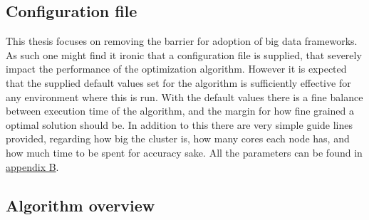 \documentclass[a4paper,english]{report}
\begin{document}
		\subsection{Configuration file}
			This thesis focuses on removing the barrier for adoption of big data frameworks. As such one might find it ironic that a configuration file is supplied, that severely impact the performance of the optimization algorithm. However it is expected that the supplied default values set for the algorithm is sufficiently effective for any environment where this is run. With the default values there is a fine balance between execution time of the algorithm, and the margin for how fine grained a optimal solution should be. In addition to this there are very simple guide lines provided, regarding how big the cluster is, how many cores each node has, and how much time to be spent for accuracy sake. All the parameters can be found in \hyperref[table:conf_params]{appendix B}.
			\clearpage
		\subsection{Algorithm overview}
\end{document}
